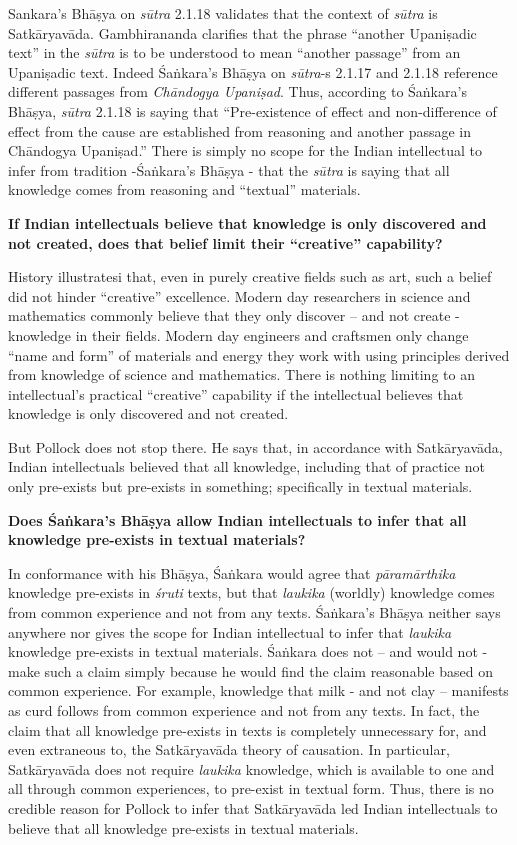 Sankara's Bhāṣya on {\sl sūtra} 2.1.18 validates that the context of {\sl sūtra} is Satkāryavāda.  Gambhirananda clarifies that the phrase ``another Upaniṣadic text'' in the {\sl sūtra} is to be understood to mean ``another passage'' from an Upaniṣadic text. Indeed Śaṅkara's Bhāṣya on {\sl sūtra}-s 2.1.17 and 2.1.18 reference different passages from {\sl Chāndogya Upaniṣad}. Thus, according to Śaṅkara's Bhāṣya, {\sl sūtra} 2.1.18 is saying that ``Pre-existence of effect and non-difference of effect from the cause are established from reasoning and another passage in Chāndogya Upaniṣad.''  There is simply no scope for the Indian intellectual to infer from tradition -Śaṅkara's Bhāṣya - that the {\sl sūtra} is saying that all knowledge comes from reasoning and ``textual'' materials.

\textbf{If Indian intellectuals believe that knowledge is only discovered and not created, does that belief limit their ``creative'' capability?}

History illustratesi that, even in purely creative fields such as art, such a belief did not hinder ``creative'' excellence.  Modern day researchers in science and mathematics commonly believe that they only discover -- and not create - knowledge in their fields.  Modern day engineers and craftsmen only change ``name and form'' of materials and energy they work with using principles derived from knowledge of science and mathematics. There is nothing limiting to an intellectual's practical ``creative'' capability if the intellectual believes that knowledge is only discovered and not created.

But Pollock does not stop there.  He says that, in accordance with Satkāryavāda, Indian intellectuals believed that all knowledge, including that of practice not only pre-exists but pre-exists in something; specifically in textual materials.

\textbf{Does Śaṅkara's Bhāṣya allow Indian intellectuals to infer that all knowledge pre-exists in textual materials?}

In conformance with his Bhāṣya, Śaṅkara would agree that {\sl pāramārthika} knowledge pre-exists in {\sl śruti} texts, but that {\sl laukika} (worldly) knowledge comes from common experience and not from any texts. Śaṅ\-kara's Bhāṣya neither says anywhere nor gives the scope for Indian intellectual to infer that {\sl laukika} knowledge pre-exists in textual materials.  Śaṅkara does not -- and would not - make such a claim simply because he would find the claim reasonable based on common experience. For example, knowledge that milk - and not clay -- manifests as curd follows from common experience and not from any texts. In fact, the claim that all knowledge pre-exists in texts is completely unnecessary for, and even extraneous to, the Satkāryavāda theory of causation. In particular, Satkāryavāda does not require {\sl laukika} knowledge, which is available to one and all through common experiences, to pre-exist in textual form. Thus, there is no credible reason for Pollock to infer that Satkāryavāda led Indian intellectuals to believe that all knowledge pre-exists in textual materials.


